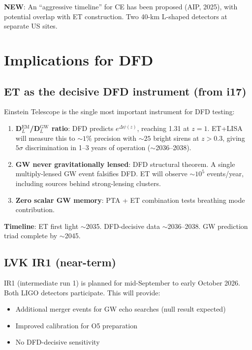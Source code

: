 \documentclass[11pt,a4paper]{article}
\newcommand{\NEW}{\textcolor{dfdblue}{\textbf{NEW}}}
\begin{document}
\textbf{\NEW}: An ``aggressive timeline'' for CE has been proposed (AIP, 2025), with potential overlap with ET construction. Two 40-km L-shaped detectors at separate US sites.

\section{Implications for DFD}

\subsection{ET as the decisive DFD instrument (from i17)}

Einstein Telescope is the single most important instrument for DFD testing:
\begin{enumerate}
\item \textbf{D$_L^{\text{EM}}$/D$_L^{\text{GW}}$ ratio}: DFD predicts $e^{\Delta\psi(z)}$, reaching 1.31 at $z = 1$. ET+LISA will measure this to $\sim 1\%$ precision with $\sim 25$ bright sirens at $z > 0.3$, giving $5\sigma$ discrimination in 1--3 years of operation ($\sim$2036--2038).

\item \textbf{GW never gravitationally lensed}: DFD structural theorem. A single multiply-lensed GW event falsifies DFD. ET will observe $\sim 10^5$ events/year, including sources behind strong-lensing clusters.

\item \textbf{Zero scalar GW memory}: PTA + ET combination tests breathing mode contribution.
\end{enumerate}

\textbf{Timeline}: ET first light $\sim$2035. DFD-decisive data $\sim$2036--2038. GW prediction triad complete by $\sim$2045.

\subsection{LVK IR1 (near-term)}

IR1 (intermediate run 1) is planned for mid-September to early October 2026. Both LIGO detectors participate. This will provide:
\begin{itemize}
\item Additional merger events for GW echo searches (null result expected)
\item Improved calibration for O5 preparation
\item No DFD-decisive sensitivity
\end{itemize}
\end{document}

